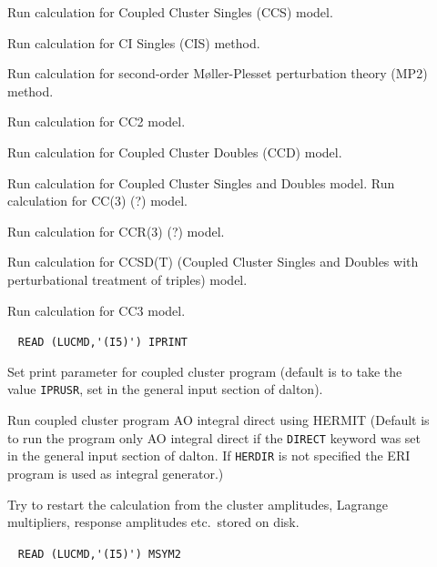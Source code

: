 \begin{description}
\item[] 
        Run calculation for Coupled Cluster Singles (CCS) model. 
%
%
%
\item[]    
        Run calculation for CI Singles (CIS) method. 
%
\item[]    
        Run calculation for second-order M{\o}ller-Plesset 
        perturbation theory (MP2) method. 
%
\item[]    
        Run calculation for CC2 model. 
%
%
\item[]    
        Run calculation for Coupled Cluster Doubles (CCD) model. 
%
\item[]   
        Run calculation for Coupled Cluster Singles and Doubles model.
%
%
%
        Run calculation for CC(3) (?) model.

\item[] 
        Run calculation for CCR(3) (?) model.
%
%
\item[]  
        Run calculation for CCSD(T) (Coupled Cluster Singles and 
        Doubles with perturbational treatment of triples) model.
%
\item[]     
        Run calculation for CC3 model.
%
\item[]  \verb| |\newline
\verb|READ (LUCMD,'(I5)') IPRINT|

       Set print parameter for coupled cluster program
       (default is to take the value \verb+IPRUSR+, set in the general
       input section of dalton).
%
\item[] 
       Run coupled cluster program AO integral direct using HERMIT
       (Default is to run the program only AO integral direct
       if the \verb+DIRECT+ keyword was set in the general
       input section of dalton. If \verb+HERDIR+ is not specified the ERI
       program is used as integral generator.) 
%
\item[] 
       Try to restart the calculation from the cluster amplitudes,
       Lagrange multipliers, response amplitudes etc.\ stored on
       disk.
%
\item[] \verb| |\newline
       \verb|READ (LUCMD,'(I5)') MSYM2|


\end{description}
